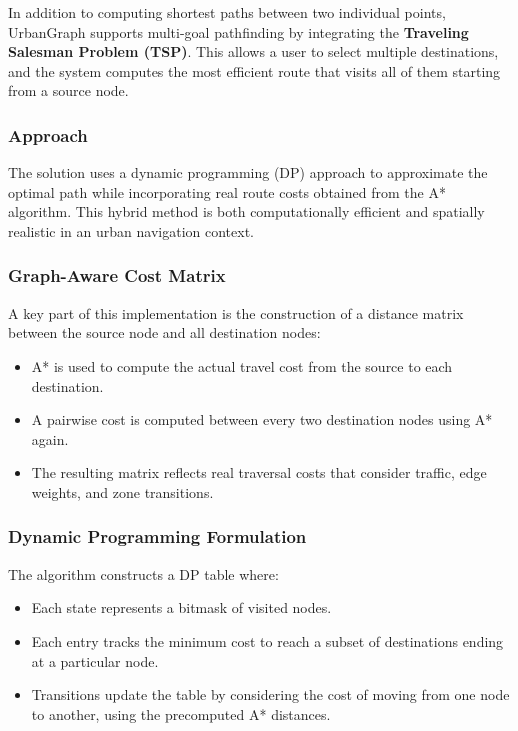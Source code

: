 \documentclass[12pt]{article}
\begin{document}
In addition to computing shortest paths between two individual points, UrbanGraph supports multi-goal pathfinding by integrating the \textbf{Traveling Salesman Problem (TSP)}. This allows a user to select multiple destinations, and the system computes the most efficient route that visits all of them starting from a source node.

\subsubsection*{Approach}

The solution uses a dynamic programming (DP) approach to approximate the optimal path while incorporating real route costs obtained from the A* algorithm. This hybrid method is both computationally efficient and spatially realistic in an urban navigation context.

\subsubsection*{Graph-Aware Cost Matrix}

A key part of this implementation is the construction of a distance matrix between the source node and all destination nodes:
\begin{itemize}
    \item A* is used to compute the actual travel cost from the source to each destination.
    \item A pairwise cost is computed between every two destination nodes using A* again.
    \item The resulting matrix reflects real traversal costs that consider traffic, edge weights, and zone transitions.
\end{itemize}

\subsubsection*{Dynamic Programming Formulation}

The algorithm constructs a DP table where:
\begin{itemize}
    \item Each state represents a bitmask of visited nodes.
    \item Each entry tracks the minimum cost to reach a subset of destinations ending at a particular node.
    \item Transitions update the table by considering the cost of moving from one node to another, using the precomputed A* distances.
\end{itemize}
\end{document}
